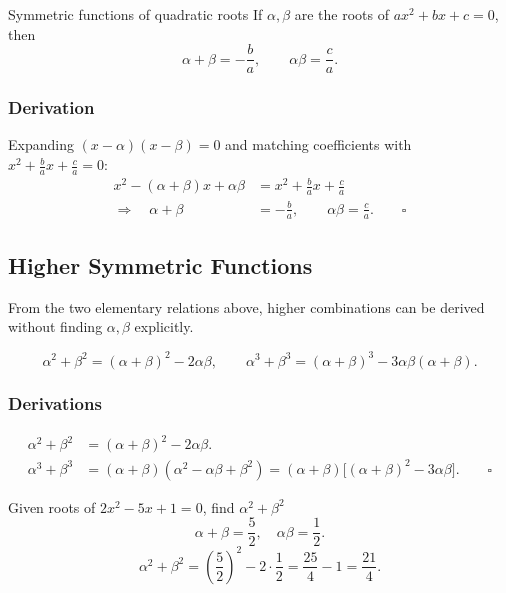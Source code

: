 \documentclass[12pt,a4paper]{article}
\theoremstyle{defstyle}
\begin{document}
\begin{result}{Symmetric functions of quadratic roots}{}
If \(\alpha,\beta\) are the roots of \(ax^2+bx+c=0\), then
\[
  \alpha+\beta = -\frac{b}{a}, \qquad \alpha\beta = \frac{c}{a}.
\]
\end{result}

\subsubsection*{Derivation}

Expanding \((x-\alpha)(x-\beta)=0\) and matching coefficients with \(x^2+\tfrac{b}{a}x+\tfrac{c}{a}=0\):
\[
\begin{aligned}
  x^2 - (\alpha+\beta)x + \alpha\beta &= x^2 + \frac{b}{a}x + \frac{c}{a} \\[4pt]
  \Rightarrow\quad \alpha+\beta &= -\frac{b}{a},\qquad \alpha\beta = \frac{c}{a}. \qquad\square
\end{aligned}
\]

\subsection{Higher Symmetric Functions}

From the two elementary relations above, higher combinations can be derived without finding \(\alpha,\beta\) explicitly.

\begin{result}{}{}
\[
  \alpha^2+\beta^2 = (\alpha+\beta)^2 - 2\alpha\beta, \qquad
  \alpha^3+\beta^3 = (\alpha+\beta)^3 - 3\alpha\beta(\alpha+\beta).
\]
\end{result}

\subsubsection*{Derivations}
\[
\begin{aligned}
  \alpha^2+\beta^2 &= (\alpha+\beta)^2 - 2\alpha\beta. \\[6pt]
  \alpha^3+\beta^3 &= (\alpha+\beta)(\alpha^2-\alpha\beta+\beta^2)
                   = (\alpha+\beta)\bigl[(\alpha+\beta)^2-3\alpha\beta\bigr]. \qquad\square
\end{aligned}
\]

\begin{example}{Given roots of $2x^2-5x+1=0$, find $\alpha^2+\beta^2$}{}
\[
  \alpha+\beta = \frac{5}{2},\quad \alpha\beta = \frac{1}{2}.
\]
\[
  \alpha^2+\beta^2 = \left(\frac{5}{2}\right)^2 - 2\cdot\frac{1}{2} = \frac{25}{4}-1 = \frac{21}{4}.
\]
\end{example}
\end{document}
